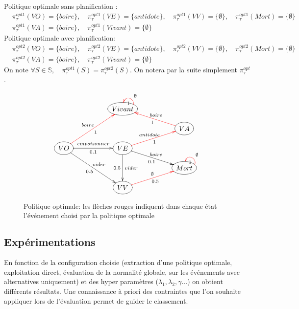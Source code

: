 \documentclass[11pt]{extarticle}
\begin{document}
Politique optimale sans planification :
\begin{align*}
    & \pi^{opt1}_\tau(VO)=\{boire\}, \quad \pi^{opt1}_\tau(VE)=\{antidote\}, \quad \pi^{opt1}_\tau(VV)=\{\emptyset\}, \quad \pi^{opt1}_\tau(Mort)=\{\emptyset\} \\
    & \pi^{opt1}_\tau(VA)=\{boire\}, \quad \pi^{opt1}_\tau(Vivant)=\{\emptyset\} \quad
\end{align*}
Politique optimale avec planification:
\begin{align}\label{pol_opti}
    & \pi^{opt2}_\tau(VO)=\{boire\}, \quad \pi^{opt2}_\tau(VE)=\{antidote\}, \quad \pi^{opt2}_\tau(VV)=\{\emptyset\}, \quad \pi^{opt2}_\tau(Mort)=\{\emptyset\} \\
    & \pi^{opt2}_\tau(VA)=\{boire\}, \quad \pi^{opt2}_\tau(Vivant)=\{\emptyset\} \quad
\end{align}
On note $\forall S\in \mathds{S},\quad \pi^{opt1}_\tau(S) =\pi^{opt2}_\tau(S)$. On notera par la suite simplement $\pi^{opt}_\tau$.
\begin{figure}[h!]
    \centering
    \[
        \xymatrix@R=1em@C=5em{
            &    *++[o][F-]{Vivant} \ar@[red]  @(r,u) []_{\emptyset}^1& \\
            &   &    *++[o][F-]{VA} \ar@[red]  [lu]_{boire}^1  \\
            *++[o][F-]{VO}  \ar @[red] [ruu]^{boire}_1 \ar [r]^{empoisonner}_{0.1} \ar[rdd]^{vider}_{0.5} &*++[o][F-]{VE} \ar@[red] [ru]^{antidote}_1 \ar[rd]^{boire}_{0.1} \ar[dd]^{vider}_{0.5}&  \\
            &    & *++[o][F-]{Mort} \ar@[red]  @(r,u) []_{\emptyset}^1 \\
             &     *++[o][F-]{VV} \ar@[red] [ru]^{\emptyset}_{0.5} &  \\
        }    
    \]
    \captionsetup{width=0.8\textwidth}
    \caption{Politique optimale: les flèches rouges indiquent dans chaque état l'événement choisi par la politique optimale}
    \label{fig:placeholder}
\end{figure}

\subsection{Expérimentations}

En fonction de la configuration choisie (extraction d'une politique optimale, exploitation direct, évaluation de la normalité globale, sur les événements avec alternatives uniquement) et des hyper paramètres ($\lambda_1,\lambda_2, \gamma$...) on obtient différents résultats. Une connaissance à priori des contraintes que l'on souhaite appliquer lors de l'évaluation permet de guider le classement. 
\end{document}
